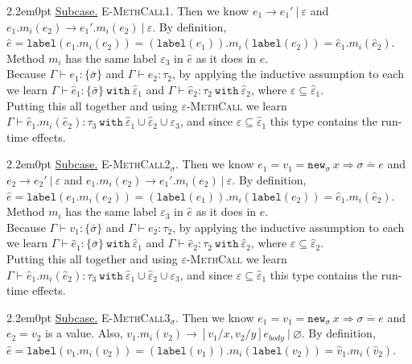 \documentclass{llncs}
\newcommand{\keywadj}[1]{\mathtt{#1}}
\newcommand{\keyw}[1]{\keywadj{#1}~}
\newcommand{\kw}[1]{\keyw{ #1 }}
\newcommand{\kwa}[1]{\keywadj{ #1 }}
\newcommand{\subcase}[1] {
	\begin{adjustwidth}{2.2em}{0pt}
		\underline{Subcase.} #1
	\end{adjustwidth}
}
\newcommand{\type}[2]{
	#1~\keyw{with} #2
}
\newcommand{\newsig}[0]{
	\keywadj{new}_\sigma~x \Rightarrow \overline{\sigma = e}
}
\begin{document}
{{	\subcase{\textsc{E-MethCall1}.				
	Then we know $e_1 \longrightarrow e_1'~|~\varepsilon$ and $e_1.m_i(e_2) \longrightarrow e_1'.m_i(e_2)~|~\varepsilon$.	 By definition, $\hat e = \keywadj{label}(e_1.m_i(e_2)) = (\keywadj{label}(e_1)).m_i(\keywadj{label}(e_2)) = \hat e_1.m_i(\hat e_2)$. Method $m_i$ has the same label $\varepsilon_3$ in $\hat e$ as it does in $e$. \\
	
	\noindent
	Because $\Gamma \vdash e_1 : \{ \bar \sigma \}$ and $\Gamma \vdash e_2 : \tau_2$, by applying the inductive assumption to each we learn $\Gamma \vdash \hat e_1 : \{ \bar \sigma \}~\kw{with} \hat \varepsilon_1$ and $\Gamma \vdash \hat e_2 : \tau_2~\kw{with} \hat \varepsilon_2$, where $\varepsilon \subseteq \hat \varepsilon_1$.\\
	
	\noindent
  Putting this all together and using \textsc{$\varepsilon$-MethCall} we learn $\Gamma \vdash \hat e_1.m_i(\hat e_2) : \type{\tau_3}{\hat \varepsilon_1 \cup \hat \varepsilon_2 \cup \varepsilon_3}$, and since $\varepsilon \subseteq \hat \varepsilon_1$ this type contains the run-time effects.\\
	}
	
	\subcase{\textsc{E-MethCall2$_\sigma$}.
	Then we know $e_1 = v_1 = \newsig$ and $e_2 \longrightarrow e_2'~|~\varepsilon$ and $e_1.m_i(e_2) \longrightarrow e_1'.m_i(e_2)~|~\varepsilon$. By definition, $\hat e = \keywadj{label}(e_1.m_i(e_2)) = (\keywadj{label}(e_1)).m_i(\keywadj{label}(e_2)) = \hat e_1.m_i(\hat e_2)$. Method $m_i$ has the same label $\varepsilon_3$ in $\hat e$ as it does in $e$. \\
	
	\noindent
	Because $\Gamma \vdash v_1 : \{ \bar \sigma \}$ and $\Gamma \vdash e_2 : \tau_2$, by applying the inductive assumption to each we learn $\Gamma \vdash \hat e_1 : \{ \bar \sigma \}~\kw{with} \hat \varepsilon_1$ and $\Gamma \vdash \hat e_2 : \tau_2~\kw{with} \hat \varepsilon_2$, where $\varepsilon \subseteq \hat \varepsilon_2$.\\
	
	\noindent
	 Putting this all together and using \textsc{$\varepsilon$-MethCall} we learn $\Gamma \vdash \hat e_1.m_i(\hat e_2) : \type{\tau_3}{\hat \varepsilon_1 \cup \hat \varepsilon_2 \cup \varepsilon_3}$, and since $\varepsilon \subseteq \hat \varepsilon_1$ this type contains the run-time effects.\\
	}
	
	\subcase{ \textsc{E-MethCall3$_\sigma$}. Then we know $e_1 = v_1 = \newsig$ and $e_2 = v_2$ is a value. Also, $v_1.m_i(v_2) \longrightarrow [v_1/x, v_2/y]e_{body}~|~\varnothing$. By definition, $\hat e = \kwa{label}(v_1.m_i(v_2)) = (\kwa{label}(v_1)).m_i(\kwa{label}(v_2)) = \hat v_1.m_i(\hat v_2)$.\\
	
}}}
\end{document}
